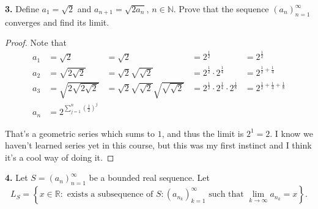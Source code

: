 \documentclass{article}
\newcommand{\R}{\mathbb{R}}
\newcommand{\N}{\mathbb{N}}
\newcommand{\set}[1]{\left\{ #1 \right\}}
\newcommand{\paren}[1]{\left( #1 \right)}
\begin{document}
\newpage %

\textbf{3. }
Define $a_1 = \sqrt{2}$ and $a_{n + 1} = \sqrt{2 a_n}$, $n \in \N$. Prove that the sequence $(a_n)_{n = 1}^\infty$ converges and find its limit.

\begin{proof}

    

    Note that 
    \begin{align*}
        a_1 &= \sqrt{2} &= \sqrt{2} &= 2^{\frac{1}{2}}  &= 2^{\frac{1}{2}} \\
        a_2 &= \sqrt{2 \sqrt{2}} &= \sqrt{2} \sqrt{\sqrt{2}} &= 2^{\frac{1}{2}} \cdot 2^{\frac{1}{4}} &= 2^{\frac{1}{2} + \frac{1}{4}} \\
        a_3 &= \sqrt{2\sqrt{2 \sqrt{2}}} &= \sqrt{2} \sqrt{\sqrt{2}} \sqrt{\sqrt{\sqrt{2}}} &= 2^{\frac{1}{2}} \cdot 2^{\frac{1}{4}} \cdot 2^{\frac{1}{8}} &= 2^{\frac{1}{2} + \frac{1}{4} + \frac{1}{8}} \\
        a_n &= 2^{\sum_{j = 1}^n \paren{\frac{1}{2}}^j}
    \end{align*}

    That's a geometric series which sums to $1$, and thus the limit is $2^1 = 2$. I know we haven't learned series yet in this course, but this was my first instinct and I think it's a cool way of doing it.
\end{proof}


\newpage %


\textbf{4. }
Let $S = (a_n)_{n = 1}^\infty$ be a bounded real sequence. Let
$$L_S = \set{x \in \R : \text{ exists a subsequence of } S : (a_{n_k})_{k = 1}^\infty \text{ such that } \lim_{k \to \infty} a_{n_k} = x}.$$
\end{document}
